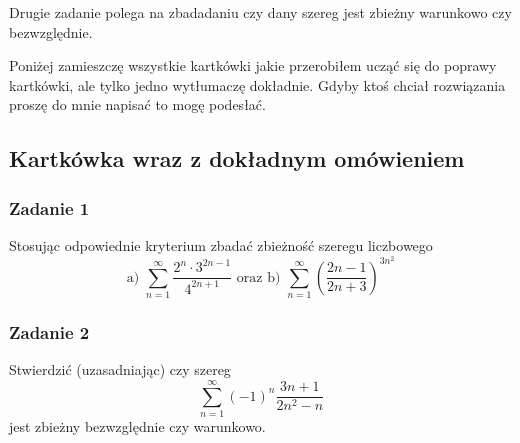 \documentclass[11pt]{article}
\begin{document}
Drugie zadanie polega na zbadadaniu czy dany szereg jest zbieżny warunkowo czy bezwzględnie.

Poniżej zamieszczę wszystkie kartkówki jakie przerobiłem ucząć się do poprawy kartkówki, ale tylko jedno wytłumaczę dokładnie.
Gdyby ktoś chciał rozwiązania proszę do mnie napisać to mogę podesłać.

\subsection{Kartkówka wraz z dokładnym omówieniem}
\subsubsection{Zadanie 1}
Stosując odpowiednie kryterium zbadać zbieżność szeregu liczbowego
\[
    \text{a) } \sum_{n = 1}^{\infty}\frac{2^n \cdot 3^{2n - 1}}{4^{2n + 1}} \text{ oraz }
    \text{b) }\sum_{n = 1}^{\infty}(\frac{2n - 1}{2n + 3})^{3n^2}
\]

\subsubsection{Zadanie 2}
Stwierdzić (uzasadniając) czy szereg
\[
    \sum_{n = 1}^{\infty} (-1)^n \frac{3n + 1}{2n^2 - n}
\]
jest zbieżny bezwzględnie czy warunkowo.
\end{document}
